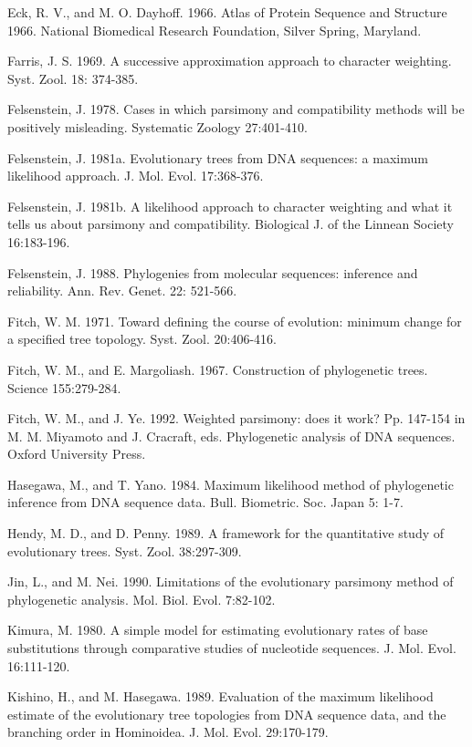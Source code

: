 {\parindent=-0.2in

\indent

{\sc Eck, R. V., } and {\sc M. O. Dayhoff.}  1966.  Atlas of Protein Sequence and 
Structure 1966.  National Biomedical Research Foundation, 
Silver Spring, Maryland.

{\sc Farris, J. S.}  1969.  A successive approximation approach to 
character weighting.  Syst. Zool. 18: 374-385.

{\sc Felsenstein, J.}  1978.  Cases in which parsimony and compatibility 
methods will be positively misleading.  Systematic Zoology 
27:401-410.

{\sc Felsenstein, J.}  1981a.  Evolutionary trees from DNA sequences:  a 
maximum likelihood approach.  J. Mol. Evol. 17:368-376.

{\sc Felsenstein, J.}  1981b.  A likelihood approach to character 
weighting and what it tells us about parsimony and 
compatibility.  Biological J. of the Linnean Society 16:183-196.

{\sc Felsenstein, J.}  1988.  Phylogenies from molecular sequences:  
inference and reliability.  Ann. Rev. Genet. 22: 521-566. 

{\sc Fitch, W. M.}  1971.  Toward defining the course of evolution:
minimum change for a specified tree topology.  Syst. Zool. 20:406-416.

{\sc Fitch, W. M.,} and {\sc E. Margoliash.}  1967.  Construction of 
phylogenetic trees.  Science 155:279-284.

{\sc Fitch, W. M.,} and {\sc J. Ye.}  1992.  Weighted parsimony:  does it work?  
Pp. 147-154 in {\sc M. M. Miyamoto} and {\sc J. Cracraft,} eds. 
Phylogenetic analysis of DNA sequences.  Oxford University 
Press.

{\sc Hasegawa, M.,} and {\sc T. Yano.}  1984.  Maximum likelihood method of 
phylogenetic inference from DNA sequence data.  Bull. 
Biometric. Soc. Japan 5: 1-7.

{\sc Hendy, M. D.,} and {\sc D. Penny.}  1989.  A framework for the
quantitative study of evolutionary trees.  Syst. Zool. 38:297-309.

{\sc Jin, L.,} and {\sc M. Nei.}  1990.  Limitations of the evolutionary parsimony 
method of phylogenetic analysis.  Mol. Biol. Evol. 7:82-102.

{\sc Kimura, M.}  1980.  A simple model for estimating evolutionary rates 
of base substitutions through comparative studies of 
nucleotide sequences. J. Mol. Evol. 16:111-120.

{\sc Kishino, H.,} and {\sc M. Hasegawa.}  1989.  Evaluation of the
maximum likelihood estimate of the evolutionary tree topologies from DNA
sequence data, and the branching order in Hominoidea.  J. Mol. Evol.
29:170-179.

}
